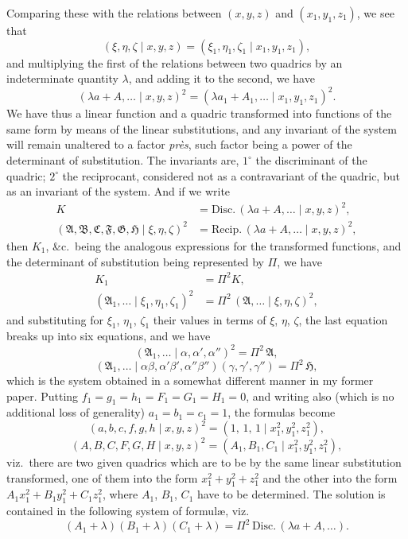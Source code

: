 \documentclass[11pt]{article}
\begin{document}
\noindent Comparing these with the relations between $(x,y,z)$ and $(x_{1},y_{1},z_{1})$, we see that
\[
(\xi,\eta,\zeta\mid x,y,z) = (\xi_{1},\eta_{1},\zeta_{1}\mid x_{1},y_{1},z_{1}),
\]
and multiplying the first of the relations between two quadrics by an indeterminate
quantity $\lambda$, and adding it to the second, we have
\[
(\lambda a + A,\ldots\mid x,y,z)^{2} = (\lambda a_{1} + A_{1},\ldots\mid x_{1},y_{1},z_{1})^{2}.
\]
We have thus a linear function and a quadric transformed into functions of the same
form by means of the linear substitutions, and any invariant of the system will remain
unaltered to a factor \textit{pr\`es}, such factor being a power of the determinant of substitution. The invariants are, $1^{\circ}$ the discriminant of the quadric; $2^{\circ}$ the reciprocant,
considered not as a contravariant of the quadric, but as an invariant of the system.
And if we write
\[
\begin{aligned}
K &= \text{Disc.}\,(\lambda a + A,\ldots\mid x,y,z)^{2},\\
(\mathfrak{A},\mathfrak{B},\mathfrak{C},\mathfrak{F},\mathfrak{G},\mathfrak{H}\mid \xi,\eta,\zeta)^{2} &= \text{Recip.}\,(\lambda a + A,\ldots\mid x,y,z)^{2},
\end{aligned}
\]
then $K_{1}$, \&c.\ being the analogous expressions for the transformed functions, and the
determinant of substitution being represented by $\Pi$, we have
\[
\begin{aligned}
K_{1} &= \Pi^{2} K,\\
(\mathfrak{A}_{1},\ldots\mid \xi_{1},\eta_{1},\zeta_{1})^{2} &= \Pi^{2}\,(\mathfrak{A},\ldots\mid \xi,\eta,\zeta)^{2},
\end{aligned}
\]
and substituting for $\xi_{1}$, $\eta_{1}$, $\zeta_{1}$ their values in terms of $\xi$, $\eta$, $\zeta$, the last equation breaks
up into six equations, and we have
\[
(\mathfrak{A}_{1},\ldots\mid \alpha,\alpha',\alpha'')^{2} = \Pi^{2}\,\mathfrak{A},
\]
\[
(\mathfrak{A}_{1},\ldots\mid \alpha\beta,\alpha'\beta',\alpha''\beta'')(\gamma,\gamma',\gamma'') = \Pi^{2}\,\mathfrak{H},
\]
which is the system obtained in a somewhat different manner in my former paper.
Putting $f_{1} = g_{1} = h_{1} = F_{1} = G_{1} = H_{1} = 0$, and writing also (which is no additional loss of
generality) $a_{1} = b_{1} = c_{1} = 1$, the formulas become
\[
(a,b,c,f,g,h\mid x,y,z)^{2} = (1,\,1,\,1\mid x_{1}^{2},y_{1}^{2},z_{1}^{2}),
\]
\[
(A,B,C,F,G,H\mid x,y,z)^{2} = (A_{1},B_{1},C_{1}\mid x_{1}^{2},y_{1}^{2},z_{1}^{2}),
\]
viz.\ there are two given quadrics which are to be by the same linear substitution
transformed, one of them into the form $x_{1}^{2} + y_{1}^{2} + z_{1}^{2}$ and the other into the form
$A_{1}x_{1}^{2} + B_{1}y_{1}^{2} + C_{1}z_{1}^{2}$, where $A_{1}$, $B_{1}$, $C_{1}$ have to be determined. The solution is contained
in the following system of formul\ae, viz.
\[
(A_{1}+\lambda)(B_{1}+\lambda)(C_{1}+\lambda) = \Pi^{2}\,\text{Disc.}\,(\lambda a + A,\ldots).
\]
\end{document}
